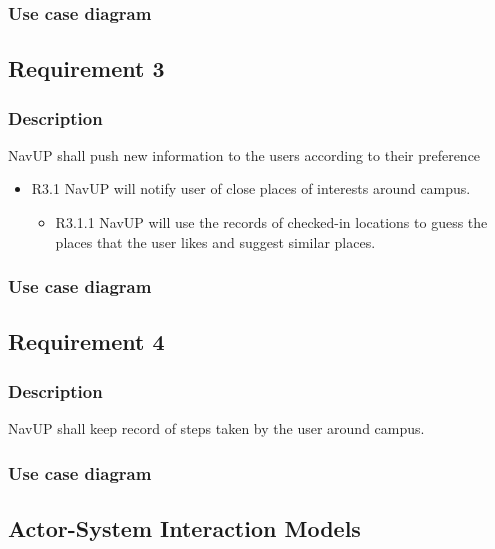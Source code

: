 \documentclass{article}
\begin{document}
        \subsubsection{Use case diagram}
        \subsection{Requirement 3}
        \subsubsection{Description}
        NavUP shall push new information to the users according to their preference
        \begin{itemize}
        \item R3.1 NavUP will notify user of close places of interests around campus.
        \begin{itemize}
        \item R3.1.1 NavUP will use the records of checked-in locations to guess the places that the user likes and suggest similar places. 
        \end{itemize}
        \end{itemize}
        \subsubsection{Use case diagram}
        \pagebreak
        \subsection{Requirement 4}
        \subsubsection{Description}
        NavUP shall keep record of steps taken by the user around campus.
        \subsubsection{Use case diagram}
        
        \subsection{Actor-System Interaction Models}
\end{document}

